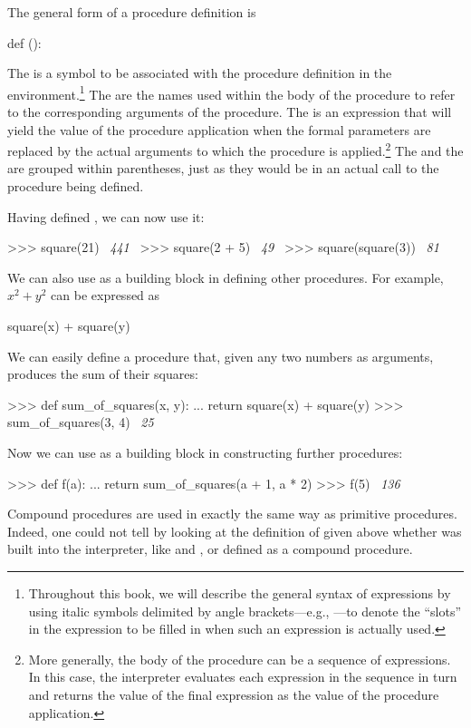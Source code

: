 The general form of a procedure definition is

\begin{syntaxForm}
def ():
\end{syntaxForm}

\noindent
The  is a symbol to be associated with the procedure definition in
the environment.\footnote{Throughout this book, we will describe the general
syntax of expressions by using italic symbols delimited by angle
brackets---e.g., ---to denote the ``slots'' in the expression to be
filled in when such an expression is actually used.} The  are the names used within the body of the procedure to refer to
the corresponding arguments of the procedure.  The  is an
expression that will yield the value of the procedure application when the
formal parameters are replaced by the actual arguments to which the procedure
is applied.\footnote{More generally, the body of the procedure can be a
sequence of expressions.  In this case, the interpreter evaluates each
expression in the sequence in turn and returns the value of the final
expression as the value of the procedure application.}  The  and
the  are grouped within parentheses, just as they
would be in an actual call to the procedure being defined.

Having defined , we can now use it:

\begin{codeBlock}
>>> square(21)
~\textit{441}~
>>> square(2 + 5)
~\textit{49}~
>>> square(square(3))
~\textit{81}~
\end{codeBlock}

\noindent
We can also use  as a building block in defining other procedures.
For example, \( x^2 + y^2 \) can be expressed as

\begin{syntaxForm}
square(x) + square(y)
\end{syntaxForm}

\noindent
We can easily define a procedure  that, given any two
numbers as arguments, produces the sum of their squares:

\begin{codeBlock}
>>> def sum_of_squares(x, y):
...     return square(x) + square(y)
>>> sum_of_squares(3, 4)
~\textit{25}~
\end{codeBlock}

\noindent
Now we can use  as a building block in constructing
further procedures:

\begin{codeBlock}
>>> def f(a):
...     return sum_of_squares(a + 1, a * 2)
>>> f(5)
~\textit{136}~
\end{codeBlock}

\noindent
Compound procedures are used in exactly the same way as primitive procedures.
Indeed, one could not tell by looking at the definition of
 given above whether  was built into the
interpreter, like \code{+} and \code{*}, or defined as a compound procedure.

